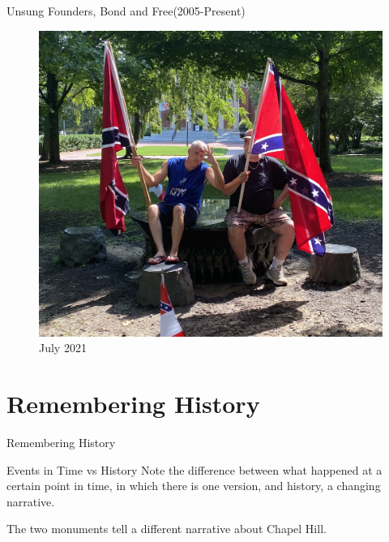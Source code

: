 \documentclass[10pt]{beamer}
\begin{document}
\begin{frame}{Unsung Founders, Bond and Free(2005-Present)}
\begin{figure}
\centering
    \includegraphics[scale = 0.1]{photos/photo8.jpg}
    \caption{July 2021}
\end{figure}
\end{frame}


\section{Remembering History}
\begin{frame}{Remembering History}
    \begin{alertblock}{Events in Time vs History}
        Note the difference between what happened at a certain point in time, in which there is one version, and history, a changing narrative. 
    \end{alertblock}
    The two monuments tell a different narrative about Chapel Hill.
\end{frame}
\end{document}
